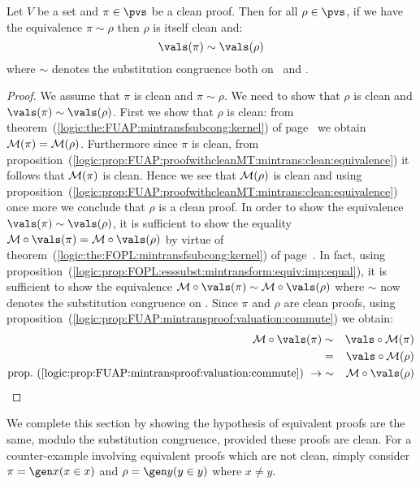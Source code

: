 \begin{prop}\label{logic:prop:FUAP:valmodsubcong:main}
Let $V$ be a set and $\pi\in\pvs$ be a clean proof. Then for all
$\rho\in\pvs$, if we have the equivalence $\pi\sim\rho$ then $\rho$
is itself clean and:
    \[
    \vals(\pi)\sim\vals(\rho)
    \]
where $\sim$ denotes the substitution congruence both on \pv\ and
\pvs.
\end{prop}
\begin{proof}
We assume that $\pi$ is clean and $\pi\sim\rho$. We need to show
that $\rho$ is clean and $\vals(\pi)\sim\vals(\rho)$. First we show
that $\rho$ is clean: from
theorem~(\ref{logic:the:FUAP:mintransfsubcong:kernel}) of
page~\pageref{logic:the:FUAP:mintransfsubcong:kernel} we obtain
${\cal M}(\pi)={\cal M}(\rho)$. Furthermore since $\pi$ is clean,
from
proposition~(\ref{logic:prop:FUAP:proofwithcleanMT:mintrans:clean:equivalence})
it follows that ${\cal M}(\pi)$ is clean. Hence we see that ${\cal
M}(\rho)$ is clean and using
proposition~(\ref{logic:prop:FUAP:proofwithcleanMT:mintrans:clean:equivalence})
once more we conclude that $\rho$ is a clean proof. In order to show
the equivalence $\vals(\pi)\sim\vals(\rho)$, it is sufficient to
show the equality ${\cal M}\circ\vals(\pi)={\cal M}\circ\vals(\rho)$
by virtue of theorem~(\ref{logic:the:FOPL:mintransfsubcong:kernel})
of page~\pageref{logic:the:FOPL:mintransfsubcong:kernel}. In fact,
using
proposition~(\ref{logic:prop:FOPL:esssubst:mintransform:equiv:imp:equal}),
it is sufficient to show the equivalence ${\cal
M}\circ\vals(\pi)\sim{\cal M}\circ\vals(\rho)$ where $\sim$ now
denotes the substitution congruence on \pvb. Since $\pi$ and $\rho$
are clean proofs, using
proposition~(\ref{logic:prop:FUAP:mintransproof:valuation:commute})
we obtain:
    \begin{eqnarray*}
    {\cal M}\circ\vals(\pi)&\sim&\vals\circ{\cal M}(\pi)\\
    &=&\vals\circ{\cal M}(\rho)\\
    \mbox{prop.~(\ref{logic:prop:FUAP:mintransproof:valuation:commute})}\ \rightarrow
    &\sim&{\cal M}\circ\vals(\rho)\\
    \end{eqnarray*}
\end{proof}

We complete this section by showing the hypothesis of equivalent
proofs are the same, modulo the substitution congruence, provided
these proofs are clean. For a counter-example involving equivalent
proofs which are not clean, simply consider $\pi=\gen x(x\in x)$ and
$\rho=\gen y(y\in y)$ where $x\neq y$.

